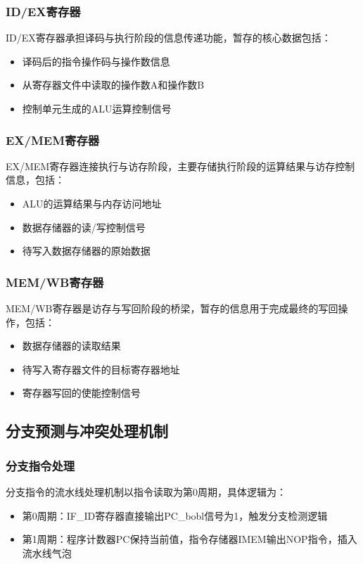 \documentclass[12pt,a4paper]{article}
\begin{document}
\subsubsection{ID/EX寄存器}
ID/EX寄存器承担译码与执行阶段的信息传递功能，暂存的核心数据包括：
\begin{itemize}
\item 译码后的指令操作码与操作数信息
\item 从寄存器文件中读取的操作数A和操作数B
\item 控制单元生成的ALU运算控制信号
\end{itemize}

\subsubsection{EX/MEM寄存器}
EX/MEM寄存器连接执行与访存阶段，主要存储执行阶段的运算结果与访存控制信息，包括：
\begin{itemize}
\item ALU的运算结果与内存访问地址
\item 数据存储器的读/写控制信号
\item 待写入数据存储器的原始数据
\end{itemize}

\subsubsection{MEM/WB寄存器}
MEM/WB寄存器是访存与写回阶段的桥梁，暂存的信息用于完成最终的写回操作，包括：
\begin{itemize}
\item 数据存储器的读取结果
\item 待写入寄存器文件的目标寄存器地址
\item 寄存器写回的使能控制信号
\end{itemize}

\subsection{分支预测与冲突处理机制}

\subsubsection{分支指令处理}
分支指令的流水线处理机制以指令读取为第0周期，具体逻辑为：
\begin{itemize}
\item 第0周期：IF\_ID寄存器直接输出PC\_bobl信号为1，触发分支检测逻辑
\item 第1周期：程序计数器PC保持当前值，指令存储器IMEM输出NOP指令，插入流水线气泡
\end{itemize}
\end{document}
